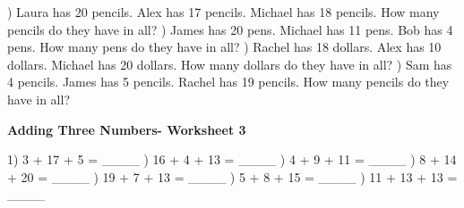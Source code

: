 \documentclass{article}%
\begin{document}
\newline%
\newline%
) Laura has 20 pencils. Alex has 17 pencils. Michael has 18 pencils. How many pencils do they have in all?%
\newline%
\newline%
) James has 20 pens. Michael has 11 pens. Bob has 4 pens. How many pens do they have in all?%
\newline%
\newline%
) Rachel has 18 dollars. Alex has 10 dollars. Michael has 20 dollars. How many dollars do they have in all?%
\newline%
\newline%
) Sam has 4 pencils. James has 5 pencils. Rachel has 19 pencils. How many pencils do they have in all?%
\newline%
\newline%
\newline%
\pagebreak%
\large%
\begin{center}%
\textbf{Adding Three Numbers- Worksheet 3}%
\newline%
\newline%
\newline%
\end{center} \normalsize%
1) 3 + 17 + 5 = \_\_\_\_%
\newline%
\newline%
) 16 + 4 + 13 = \_\_\_\_%
\newline%
\newline%
) 4 + 9 + 11 = \_\_\_\_%
\newline%
\newline%
) 8 + 14 + 20 = \_\_\_\_%
\newline%
\newline%
) 19 + 7 + 13 = \_\_\_\_%
\newline%
\newline%
) 5 + 8 + 15 = \_\_\_\_%
\newline%
\newline%
) 11 + 13 + 13 = \_\_\_\_%
\newline%
\end{document}
